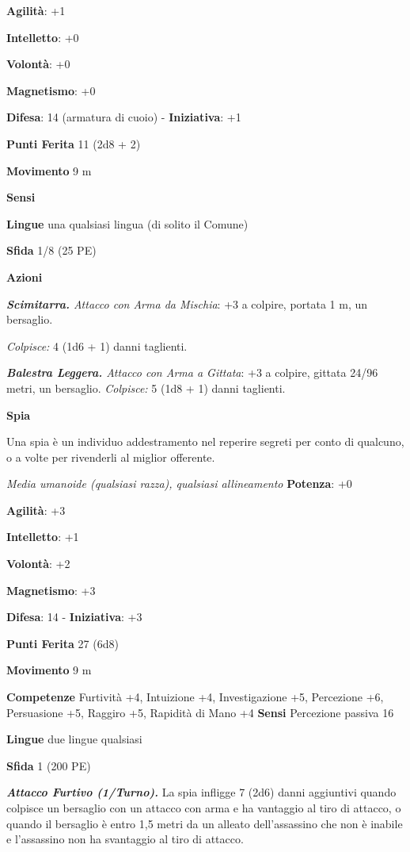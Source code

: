 \begin{multicols}{2}
\textbf{Agilità}: +1

\textbf{Intelletto}: +0

\textbf{Volontà}: +0

\textbf{Magnetismo}: +0

\textbf{Difesa}: 14 (armatura di cuoio) - \textbf{Iniziativa}: +1

\textbf{Punti Ferita} 11 (2d8 + 2)

\textbf{Movimento} 9 m

\textbf{Sensi} 

\textbf{Lingue} una qualsiasi lingua (di solito il Comune)

\textbf{Sfida} 1/8 (25 PE)\smallskip

\smallskip\textbf{Azioni}

\emph{\textbf{Scimitarra.} Attacco con Arma da Mischia}: +3 a colpire,
portata 1 m, un bersaglio.

\emph{Colpisce:} 4 (1d6 + 1) danni taglienti.

\emph{\textbf{Balestra Leggera.} Attacco con Arma a Gittata}: +3 a
colpire, gittata 24/96 metri, un bersaglio. \emph{Colpisce:} 5 (1d8 + 1)
danni taglienti.

\textbf{Spia}

Una spia è un individuo addestramento nel reperire segreti per conto di
qualcuno, o a volte per rivenderli al miglior offerente.

\emph{Media umanoide (qualsiasi razza), qualsiasi allineamento}
\textbf{Potenza}: +0

\textbf{Agilità}: +3

\textbf{Intelletto}: +1

\textbf{Volontà}: +2

\textbf{Magnetismo}: +3

\textbf{Difesa}: 14 - \textbf{Iniziativa}: +3

\textbf{Punti Ferita} 27 (6d8)

\textbf{Movimento} 9 m

\textbf{Competenze} Furtività +4, Intuizione +4, Investigazione +5,
Percezione +6, Persuasione +5, Raggiro +5, Rapidità di Mano +4
\textbf{Sensi} Percezione passiva 16

\textbf{Lingue} due lingue qualsiasi

\textbf{Sfida} 1 (200 PE)\smallskip

\emph{\textbf{Attacco Furtivo (1/Turno).}} La spia infligge 7 (2d6)
danni aggiuntivi quando colpisce un bersaglio con un attacco con arma e
ha vantaggio al tiro di attacco, o quando il bersaglio è entro 1,5 metri
da un alleato dell'assassino che non è inabile e l'assassino non ha
svantaggio al tiro di attacco.


\end{multicols}
